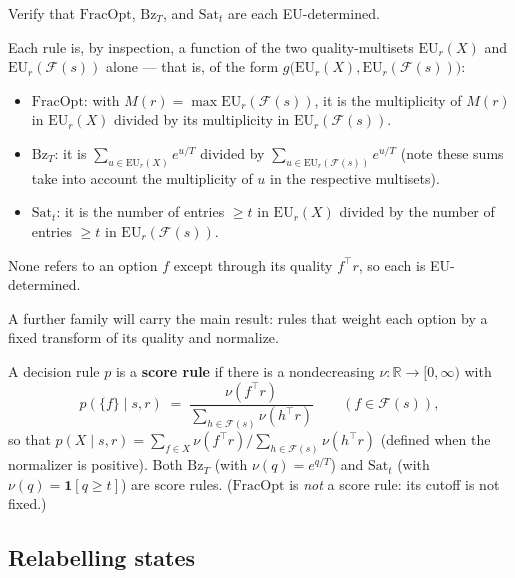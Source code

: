 \documentclass[11pt]{article}
\newcommand{\R}{\mathbb{R}}
\newcommand{\F}{\mathcal{F}}       %
\begin{document}
\begin{exercise}
\label{prob:rules_eu} Verify that $\mathrm{FracOpt}$, $\mathrm{Bz}_T$, and
$\mathrm{Sat}_t$ are each EU-determined.
\end{exercise}

\begin{solution}
Each rule is, by inspection, a function of the two quality-multisets $\mathrm{EU}_r(X)$ and
$\mathrm{EU}_r(\F(s))$ alone --- that is, of the form
$g\bigl(\mathrm{EU}_r(X), \mathrm{EU}_r(\F(s))\bigr)$:
\begin{itemize}\itemsep=2pt
  \item $\mathrm{FracOpt}$: with $M(r) = \max \mathrm{EU}_r(\F(s))$, it is the multiplicity of
  $M(r)$ in $\mathrm{EU}_r(X)$ divided by its multiplicity in $\mathrm{EU}_r(\F(s))$.
  \item $\mathrm{Bz}_T$: it is $\sum_{u \in \mathrm{EU}_r(X)} e^{u/T}$ divided by
  $\sum_{u \in \mathrm{EU}_r(\F(s))} e^{u/T}$ (note these sums take into account the multiplicity of $u$ in the respective multisets).
  \item $\mathrm{Sat}_t$: it is the number of entries $\ge t$ in $\mathrm{EU}_r(X)$ divided by
  the number of entries $\ge t$ in $\mathrm{EU}_r(\F(s))$.
\end{itemize}
None refers to an option $f$ except through its quality $f^\top r$, so each is EU-determined.
\end{solution}

A further family will carry the main result: rules that weight each option by a fixed transform of
its quality and normalize.

\begin{definition}\label{def:score_rule}
A decision rule $p$ is a \textbf{score rule} if there is a nondecreasing
$\nu : \R \to [0,\infty)$ with
$$
p(\{f\}\mid s, r) \;=\; \frac{\nu(f^\top r)}{\sum_{h\in\F(s)}\nu(h^\top r)} \qquad (f \in \F(s)),
$$
so that $p(X\mid s,r) = \sum_{f\in X}\nu(f^\top r)\big/\sum_{h\in\F(s)}\nu(h^\top r)$ (defined when
the normalizer is positive). Both $\mathrm{Bz}_T$ (with $\nu(q) = e^{q/T}$) and $\mathrm{Sat}_t$
(with $\nu(q) = \mathbf{1}[q\ge t]$) are score rules. ($\mathrm{FracOpt}$ is \emph{not} a score
rule: its cutoff is not fixed.)
\end{definition}

\subsection*{Relabelling states}
\end{document}
